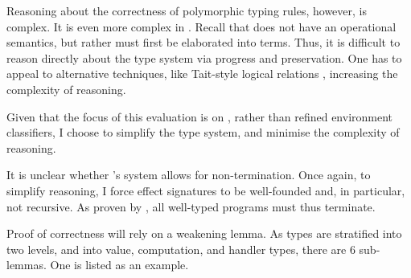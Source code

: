 Reasoning about the correctness of polymorphic typing rules, however, is complex. It is even more complex in \calculusName{}. Recall that \sourceLang{} does not have an operational semantics, but rather must first be elaborated into \coreLang{} terms. Thus, it is difficult to reason directly about the \sourceLang{} type system via progress and preservation. One has to appeal to alternative techniques, like Tait-style logical relations \citep{tait-67}, increasing the complexity of reasoning.

Given that the focus of this evaluation is on \sourceLang{}, rather than refined environment classifiers, I choose to simplify the type system, and minimise the complexity of reasoning. 

It is unclear whether \citeauthor{isoda-24}'s system allows for non-termination. Once again, to simplify reasoning, I force effect signatures to be well-founded and, in particular, not recursive. As proven by \citet{kammar-2013}, all well-typed programs must thus terminate. 

Proof of correctness will rely on a weakening lemma. As types are stratified into two levels, and into value, computation, and handler types, there are 6 sub-lemmas. One is listed as an example.

\newcommand{\rcqtypejudge}[4][\Gamma]{{#1} \vdash_{\compilemode \mid \quotemode}^{#2} {#3} : {#4}}
\newcommand{\rctypejudge}[4][\Gamma]{{#1} \vdash_{\compilemode}^{#2} {#3} : {#4}}
\newcommand{\rqtypejudge}[4][\Gamma]{{#1} \vdash_{\quotemode}^{#2} {#3}: {#4}}
\newcommand{\rstypejudge}[3][\Gamma]{{#1} \vdash_{\splicemode} {#2} : {#3}}

